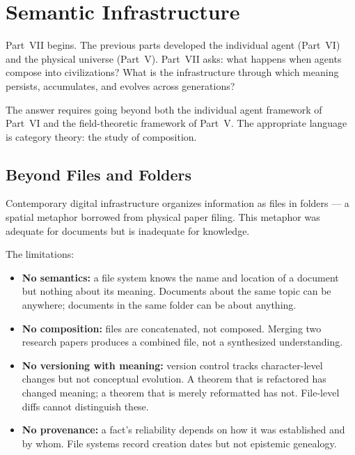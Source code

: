 
\chapter{Semantic Infrastructure}



Part~VII begins. The previous parts developed the individual agent
(Part~VI) and the physical universe (Part~V). Part~VII asks: what happens
when agents compose into civilizations? What is the infrastructure through
which meaning persists, accumulates, and evolves across generations?

The answer requires going beyond both the individual agent framework of
Part~VI and the field-theoretic framework of Part~V. The appropriate
language is category theory: the study of composition.

\section{Beyond Files and Folders}

Contemporary digital infrastructure organizes information as files in
folders — a spatial metaphor borrowed from physical paper filing.
This metaphor was adequate for documents but is inadequate for knowledge.

The limitations:

\begin{itemize}
  \item \textbf{No semantics:} a file system knows the name and location
        of a document but nothing about its meaning. Documents about the
        same topic can be anywhere; documents in the same folder can be
        about anything.
  \item \textbf{No composition:} files are concatenated, not composed.
        Merging two research papers produces a combined file, not a
        synthesized understanding.
  \item \textbf{No versioning with meaning:} version control tracks
        character-level changes but not conceptual evolution. A theorem
        that is refactored has changed meaning; a theorem that is
        merely reformatted has not. File-level diffs cannot distinguish
        these.
  \item \textbf{No provenance:} a fact's reliability depends on how it
        was established and by whom. File systems record creation dates
        but not epistemic genealogy.
\end{itemize}


